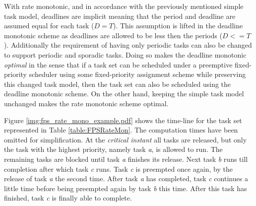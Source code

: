 With rate monotonic, and in accordance with the previously mentioned simple task model, deadlines are implicit meaning that the period and deadline are assumed equal for each task ($D = T$). This assumption is lifted in the deadline monotonic scheme as deadlines are allowed to be less then the periods ($D <= T$). Additionally the requirement of having only periodic tasks can also be changed to support periodic and sporadic tasks. Doing so makes the deadline monotonic \textit{optimal} in the sense that if a task set can be scheduled under a preemptive fixed-priority scheduler using some fixed-priority assignment scheme while preserving this changed task model, then the task set can also be scheduled using the deadline monotonic scheme. On the other hand, keeping the simple task model unchanged makes the rate monotonic scheme optimal.

Figure \ref{img:fps_rate_mono_example.pdf} shows the time-line for the task set represented in Table \ref{table:FPSRateMon}. The computation times have been omitted for simplification. At the \textit{critical instant} all tasks are released, but only the task with the highest priority, namely task \textit{a}, is allowed to run. The remaining tasks are blocked until task \textit{a} finishes its release. Next task \textit{b} runs till completion after which task \textit{c} runs. Task \textit{c} is preempted once again, by the release of task \textit{a} the second time. After task \textit{a} has completed, task \textit{c} continues a little time before being preempted again by task \textit{b} this time. After this task has finished, task \textit{c} is finally able to complete.



